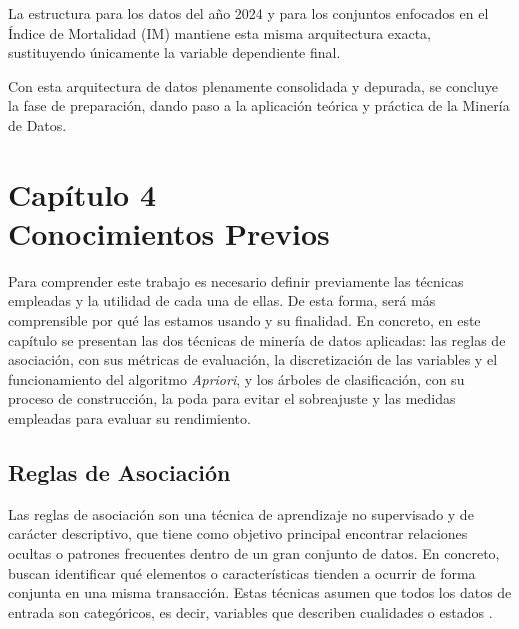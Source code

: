 \documentclass[twoside,a4paper,12pt,onecolumn,openany]{book}
\begin{document}
\vspace{0.5cm}

La estructura para los datos del año 2024 y para los conjuntos enfocados en el Índice de Mortalidad (IM) mantiene esta misma arquitectura exacta, sustituyendo únicamente la variable dependiente final.

\vspace{0.5cm}

Con esta arquitectura de datos plenamente consolidada y depurada, se concluye la fase de preparación, dando paso a la aplicación teórica y práctica de la Minería de Datos.


\setcounter{chapter}{4}
\chapter*{Capítulo 4 \\ \vspace{1cm} Conocimientos Previos}

\setcounter{section}{0}
\setcounter{subsection}{0}

\setcounter{chapter}{4}
\setcounter{figure}{0}\setcounter{table}{0}


Para comprender este trabajo es necesario definir previamente las técnicas empleadas y la utilidad de cada una de ellas. De esta forma, será más comprensible por qué las estamos usando y su finalidad. En concreto, en este capítulo se presentan las dos técnicas de minería de datos aplicadas: las reglas de asociación, con sus métricas de evaluación, la discretización de las variables y el funcionamiento del algoritmo \textit{Apriori}, y los árboles de clasificación, con su proceso de construcción, la poda para evitar el sobreajuste y las medidas empleadas para evaluar su rendimiento.


\section{Reglas de Asociación}

Las reglas de asociación son una técnica de aprendizaje no supervisado y de carácter descriptivo, que tiene como objetivo principal encontrar relaciones ocultas o patrones frecuentes dentro de un gran conjunto de datos. En concreto, buscan identificar qué elementos o características tienden a ocurrir de forma conjunta en una misma transacción. Estas técnicas asumen que todos los datos de entrada son categóricos, es decir, variables que describen cualidades o estados \cite{apuntes_teoria2025}. 
\end{document}
